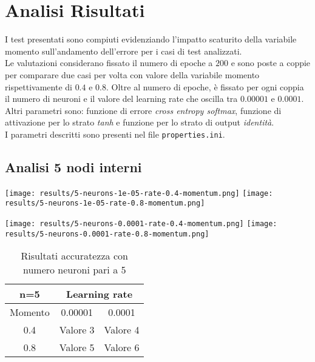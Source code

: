 \chapter{Analisi Risultati}
I test presentati sono compiuti evidenziando l'impatto scaturito della variabile momento sull'andamento dell'errore per i casi di test analizzati.\\
Le valutazioni considerano fissato il numero di epoche a $200$ e sono poste a coppie per comparare due casi per volta con valore della variabile momento rispettivamente di $0.4$ e $0.8$. Oltre al numero di epoche, è fissato per ogni coppia il numero di neuroni e il valore del learning rate che oscilla tra $0.00001$ e $0.0001$. \\
Altri parametri sono: funzione di errore \textit{cross entropy softmax}, funzione di attivazione per lo strato \textit{tanh} e funzione per lo strato di output \textit{identità}.\\
I parametri descritti sono presenti nel file \texttt{properties.ini}.
{\clearpage}
\section{Analisi 5 nodi interni}
\begin{center}
\texttt{[image: results/5-neurons-1e-05-rate-0.4-momentum.png]}
\texttt{[image: results/5-neurons-1e-05-rate-0.8-momentum.png]}
\end{center}

\begin{center}
\texttt{[image: results/5-neurons-0.0001-rate-0.4-momentum.png]}
\texttt{[image: results/5-neurons-0.0001-rate-0.8-momentum.png]}
\end{center}
\begin{table}[htbp]
    \centering
    \begin{tabular}{|c|c|c|}
    \hline
    n=5 & \multicolumn{2}{c|}{Learning rate} \\
    \hline
    Momento & 0.00001 & 0.0001 \\
    \hline
    0.4 & Valore 3 & Valore 4 \\
    \hline
    0.8 & Valore 5 & Valore 6 \\
    \hline
    \end{tabular}
    \caption{Risultati accuratezza con numero neuroni pari a 5}
\end{table}

